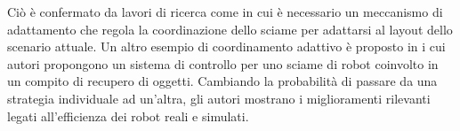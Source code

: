 Ciò è confermato da lavori di ricerca come \cite{cimino2015combining} in cui è necessario un meccanismo di adattamento che regola la coordinazione dello sciame per adattarsi al layout dello scenario attuale. 
Un altro esempio di coordinamento adattivo è proposto in \cite{labella2006division} i cui autori propongono un sistema di controllo per uno sciame di robot coinvolto in un compito di recupero di oggetti. 
Cambiando la probabilità di passare da una strategia individuale ad un’altra, gli autori mostrano i miglioramenti rilevanti legati all’efficienza dei robot reali e simulati.